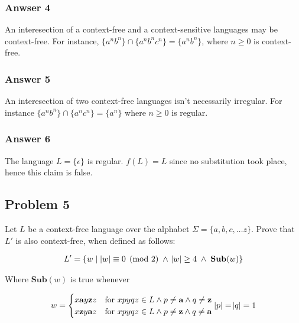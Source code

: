 \documentclass[11pt]{article}
\newcommand{\for}{\text{for }}
\begin{document}
\subsubsection{Anwser 4}
\label{sec-1-4-1}
An interesection of a context-free and a context-sensitive languages may be
context-free.  For instance, $\{a^nb^n\} \cap \{a^nb^nc^n\} = \{a^nb^n\}$,
where $n \geq 0$ is context-free.

\subsubsection{Answer 5}
\label{sec-1-4-2}
An interesection of two context-free languages isn't necessarily irregular.
For instance $\{a^nb^n\} \cap \{a^nc^n\} = \{a^n\}$ where $n \geq 0$ is
regular.

\subsubsection{Answer 6}
\label{sec-1-4-3}
The language $L = \{\epsilon\}$ is regular.  $f(L) = L$ since no
substitution took place, hence this claim is false.

\subsection{Problem 5}
\label{sec-1-5}
Let $L$ be a context-free language over the alphabet $\Sigma = \{a,b,c,\dots
   z\}$.  Prove that $L'$ is also context-free, when defined as follows:

\begin{align*}
  L' = \{w \;|\; \abs{w} \equiv 0 \pmod{2}
                 \;\land\; \abs{w} \geq 4 
                 \;\land\; \textbf{Sub}(w)\}
\end{align*}


Where $\textbf{Sub}(w)$ is true whenever

\begin{equation*}
  w = \begin{cases}
    x\textbf{a}y\textbf{z}z &\for xpyqz \in L 
                             \land p \neq \textbf{a}
                             \land q \neq \textbf{z} \\

    x\textbf{z}y\textbf{a}z &\for xpyqz \in L 
                             \land p \neq \textbf{z}
                             \land q \neq \textbf{a}
  \end{cases} \\
  \abs{p} = \abs{q} = 1
\end{equation*}
\end{document}
